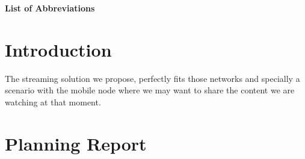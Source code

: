 \documentclass[12pt, a4paper,twoside]{tesi_upf}
\begin{document}
\cleardoublepage

%


\tableofcontents

\listoffigures

\listoftables

\cleardoublepage
\thispagestyle{empty}
\vspace*{1.95cm} \hspace*{-0.155cm} %
\textbf{{\huge \sffamily List of Abbreviations}\\}
\vspace*{0.5cm}         
\begin{acronym}
\end{acronym}

\mainmatter
\chapter{Introduction}











The streaming solution we propose, perfectly fits those networks and specially a scenario with the mobile node where we may want to share the content we are watching at that moment.  


\chapter{Planning Report}
\end{document}
